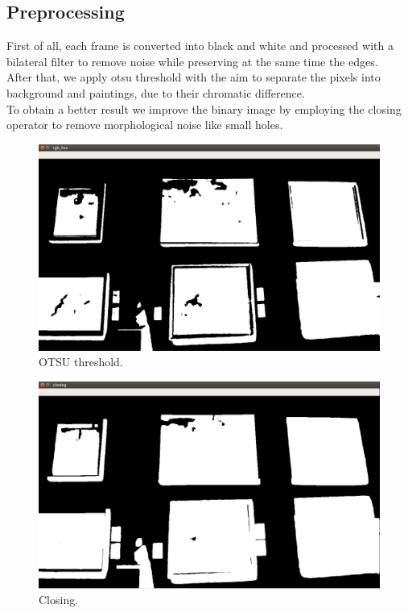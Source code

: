 \documentclass[conference]{IEEEtran}
\begin{document}
\subsection{Preprocessing}
First of all, each frame is converted into black and white and processed with a bilateral filter to remove noise while preserving at the same time the edges.\\
After that, we apply otsu threshold  with the aim to separate the pixels into background and paintings, due to their chromatic difference.\\
To obtain a better result we improve the binary image by employing the closing operator to remove morphological noise like small holes.\\ 

\bigskip


\begin{figure}[htbp]
  \centering
  \includegraphics[width=0.8\columnwidth]{../detection_pipeline/1_otsu_threshold.png}
  \caption{OTSU threshold.}
  \label{fig:ROC_curve}
\end{figure}

\bigskip

\begin{figure}[htbp]
  \centering
  \includegraphics[width=0.8\columnwidth]{../detection_pipeline/2_closing.png}
  \caption{Closing.}
  \label{fig:ROC_curve}
\end{figure}
\end{document}
